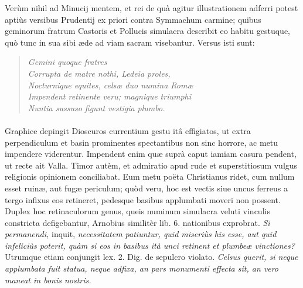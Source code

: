 \documentclass[a4paper, 11pt, oneside, polutonikogreek, latin]{article}
\begin{document}
Verùm nihil ad Minucij mentem, et rei de quà agitur illustrationem adferri potest aptiùs versibus Prudentij ex priori contra Symmachum carmine; quibus geminorum fratrum Castoris et Pollucis simulacra describit eo habitu gestuque, quò tunc in sua sibi æde ad viam sacram visebantur. Versus isti sunt:
\begin{quote}
\hspace*{15mm}\emph{Gemini quoque fratres}\\
\emph{Corrupta de matre nothi, Ledeia proles,}\\
\emph{Nocturnique equites, celsæ duo numina Romæ}\\
\emph{Impendent retinente veru; magnique triumphi}\\
\emph{Nuntia sussuso figunt vestigia plumbo.}\\
\end{quote}
\vspace*{-8mm}
\paragraph{}
Graphice depingit Dioscuros currentium gestu itâ effigiatos, ut extra perpendiculum et basin prominentes spectantibus non sinc horrore, ac metu impendere viderentur. Impendent enim quæ suprà caput iamiam casura pendent, ut recte ait Valla. Timor autèm, et admiratio apud rude et superstitiosum vulgus religionis opinionem conciliabat. Eum metu poëta Christianus ridet, cum nullum esset ruinæ, aut fugæ periculum; quòd veru, hoc est vectis siue uncus ferreus a tergo infixus eos retineret, pedesque basibus applumbati moveri non possent. Duplex hoc retinaculorum genus, queis numinum simulacra veluti vinculis constricta defigebantur, Arnobius similitèr lib. 6. nationibus exprobrat. \emph{Si permanendi,} inquit, \emph{necessitatem patiuntur, quid miseriùs his esse, aut quid infeliciùs poterit, quàm si eos in basibus ità unci retinent et plumbeæ vinctiones?} Utrumque etiam conjungit lex. 2. Dig. de sepulcro violato. \emph{Celsus querit, si neque applumbata fuit statua, neque adfixa, an pars monumenti effecta sit, an vero maneat in bonis nostris.}
\end{document}
